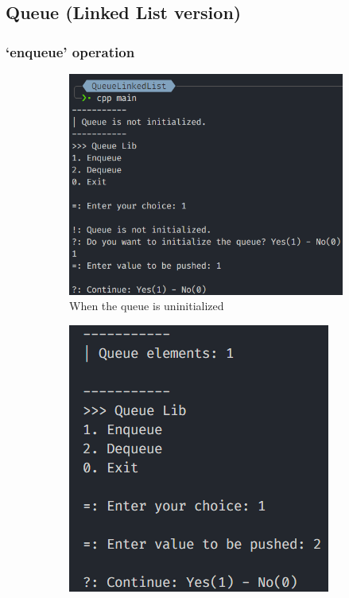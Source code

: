 \pagebreak
\subsection{Queue (Linked List version)}
\subsubsection*{`enqueue' operation}
\begin{figure}[!ht]
	\centering
	\begin{subfigure}{0.55\textwidth}
		\centering
		\includegraphics[width=\textwidth]{imgs/queueLinkedList/push/empty.png}
		\caption{When the queue is uninitialized}\label{fig:queue_ll_push_empty}
	\end{subfigure}
	\hfill
	\begin{subfigure}{0.43\textwidth}
		\centering
		\includegraphics[width=\textwidth]{imgs/queueLinkedList/push/normal.png}

\end{subfigure}
\end{figure}
